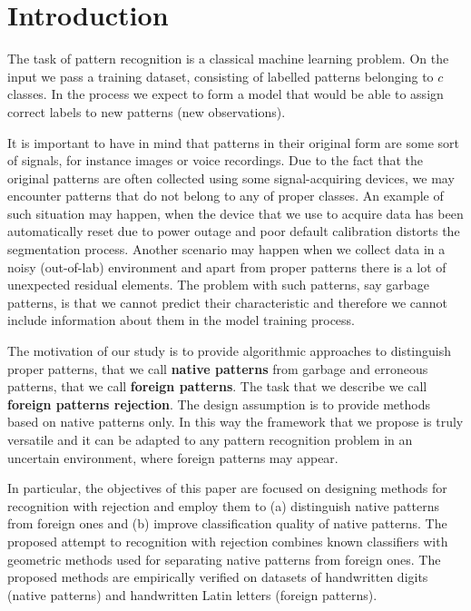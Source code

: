 \documentclass{llncs}
\begin{document}
\vspace{-12pt}
\section{Introduction}
  \label{sec:Introduction}
\vspace{-3pt}

The task of pattern recognition is a classical machine learning problem. On the input we pass a training dataset, consisting of labelled patterns belonging to $c$ classes. In the process we expect to form a model that would be able to assign correct labels to new patterns (new observations).

It is important to have in mind that patterns in their original form are some sort of signals, for instance images or voice recordings. Due to the fact that the original patterns are often collected using some signal-acquiring devices, we may encounter patterns that do not belong to any of proper classes. An example of such situation may happen, when the device that we use to acquire data has been automatically reset due to power outage and poor default calibration distorts the segmentation process. Another scenario may happen when we collect data in a noisy (out-of-lab) environment and apart from proper patterns there is a lot of unexpected residual elements. The problem with such patterns, say garbage patterns, is that we cannot predict their characteristic and therefore we cannot include information about them in the model training process.

The motivation of our study is to provide algorithmic approaches to distinguish proper patterns, that we call \textbf{native patterns} from garbage and erroneous patterns, that we call \textbf{foreign patterns}. The task that we describe we call \textbf{foreign patterns rejection}. The design assumption is to provide methods based on native patterns only. In this way the framework that we propose is truly versatile and it can be adapted to any pattern recognition problem in an uncertain environment, where foreign patterns may appear. 

In particular, the objectives of this paper are focused on designing methods for recognition with rejection and employ them to (a) distinguish native patterns from foreign ones and (b) improve classification quality of native patterns. The proposed attempt to recognition with rejection combines known classifiers with geometric methods used for separating native patterns from foreign ones. The proposed methods are empirically verified on datasets of handwritten digits (native patterns) and handwritten Latin letters (foreign patterns).
\end{document}
